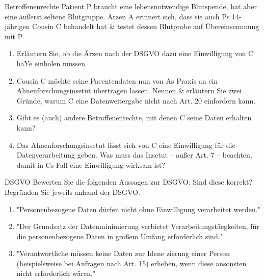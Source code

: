 \documentclass{exercisesheet}
\begin{document}
\begin{exercise*}{Betroffenenrechte}
  Patient P braucht eine lebensnotwendige Blutspende, hat aber eine äußerst seltene Blutgruppe. Ärzen A erinnert sich, dass sie auch Ps 14-jährigen Cousin C behandelt hat \& testet dessen Blutprobe auf Übereinsemmung mit P.
  \begin{enumerate}
    \item Erläutern Sie, ob die Ärzen nach der DSGVO dazu eine Einwilligung von C häYe einholen müssen.
    \item Cousin C möchte seine Paeentendaten nun von As Praxis an ein Ahnenforschungsinsetut übertragen lassen. Nennen \& erläutern Sie zwei Gründe, warum C eine Datenweitergabe nicht nach Art. 20 einfordern kann.
    \item Gibt es (auch) andere Betroffenenrechte, mit denen C seine Daten erhalten kann?
    \item Das Ahnenforschungsinsetut lässt sich von C eine Einwilligung für die Datenverarbeitung geben. Was muss das Insetut – außer Art. 7 – beachten, damit in Cs Fall eine Einwilligung wirksam ist?
  \end{enumerate}
\end{exercise*}

\begin{exercise*}{DSGVO}
  Bewerten Sie die folgenden Aussagen zur DSGVO. Sind diese korrekt? Begründen Sie jeweils anhand der DSGVO.
  \begin{enumerate}
    \item "Personenbezogene Daten dürfen nicht ohne Einwilligung verarbeitet werden."
    \item "Der Grundsatz der Datenminimierung verbietet Verarbeitungstäegkeiten, für die personenbezogene Daten in großem Umfang erforderlich sind."
    \item "Verantwortliche müssen keine Daten zur Idene zierung einer Person (beispielsweise bei Anfragen nach Art. 15) erheben, wenn diese ansonsten nicht erforderlich wären."
  \end{enumerate}
\end{exercise*}
\end{document}
